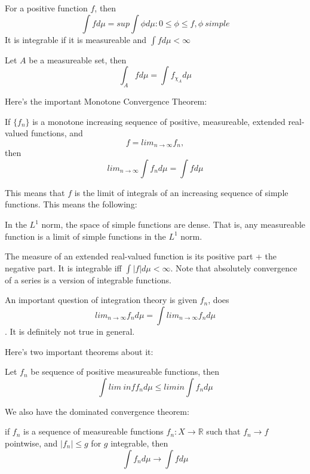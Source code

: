 \documentclass[main.tex]{subfiles}
\begin{document}
For a positive function $f$, then 
$$
\int f d\mu = sup{\int \phi d\mu: 0 \leq \phi \leq f, \phi \ simple}
$$
It is integrable if it is measureable and $\int f d\mu < \infty$


Let $A$ be a measureable set, then 
$$
\int_A f d\mu = \int f_{\chi_A}d\mu
$$

Here's the important Monotone Convergence Theorem:

\begin{theorem}
If $\{f_n\}$ is a monotone increasing sequence of positive, measureable, extended real-valued functions, and 
$$
f = lim_{n\rightarrow \infty} f_n,
$$
then 
$$
lim_{n \rightarrow \infty} \int f_n d\mu = \int f d\mu
$$
\end{theorem}

This means that $f$ is the limit of integrals of an increasing sequence of simple functions. This means the following:

\begin{lemma}
In the $L^1$ norm, the space of simple functions are dense. That is, any measureable function is a limit of simple functions in the $L^1$ norm.
\end{lemma}

The measure of an extended real-valued function is its positive part  + the negative part.
It is integrable iff $\int |f| d\mu < \infty$. Note that absolutely convergence of a series is a version of integrable functions.

An important question of integration theory is given $f_n$, does $$
lim_{n \rightarrow \infty} f_n d \mu = \int lim_{n \rightarrow \infty} f_n d \mu
$$.
It is definitely not true in general. 

Here's two important theorems about it:

\begin{theorem}
Let $f_n$ be sequence of positive measureable functions, then 
$$
\int lim\ inf f_n d\mu \leq lim in \int f_n d\mu
$$
\end{theorem}


We also have the dominated convergence theorem:
\begin{theorem}
if $f_n$ is a sequence of measureable functions $f_n: X \rightarrow \mathbb{R}$ such that $f_n \rightarrow f$ pointwise, and $|f_n| \leq g$ for $g$ integrable, then
$$
\int f_n d\mu \rightarrow \int f d\mu 
$$
\end{theorem}
\end{document}
